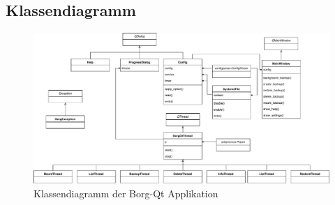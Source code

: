 \newpage
\begin{landscape}
\subsection{Klassendiagramm}
\label{sec:orgc41601b}
\begin{figure}[H]
\centering
\includegraphics[height=.7\textwidth]{pictures/class_diagramm.pdf}
\caption{\label{fig:org7e6152c}
Klassendiagramm der Borg-Qt Applikation}
\end{figure}
\end{landscape}

